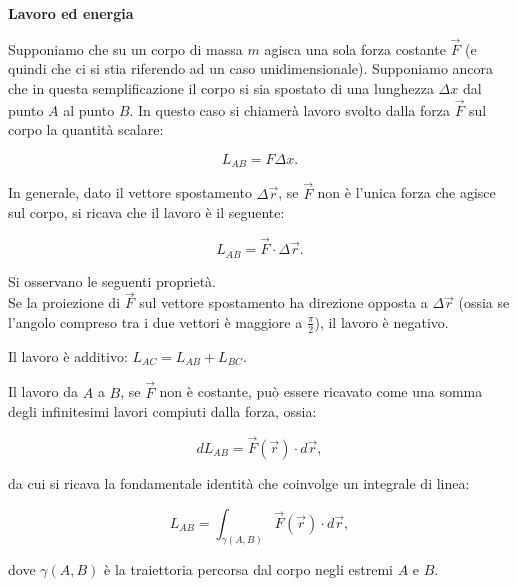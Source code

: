 \documentclass[11pt]{article}
\begin{document}
	\begin{center}
		\Large \textbf{Lavoro ed energia}
	\end{center}
	
	Supponiamo che su un corpo di massa $m$ agisca una sola forza
	costante $\vec{F}$ (e quindi che ci si stia riferendo
	ad un caso unidimensionale). Supponiamo ancora che
	in questa semplificazione il corpo si sia spostato
	di una lunghezza $\Delta x$ dal punto $A$ al 
	punto $B$. In questo caso si chiamerà
	lavoro svolto dalla forza $\vec{F}$ sul corpo la quantità
	scalare:
	
	\[ L_{AB} = F \Delta x. \]
	
	In generale, dato il vettore spostamento
	$\Delta \Vec{r}$, se $\Vec{F}$ non è l'unica forza
	che agisce sul corpo, si ricava che il lavoro è il seguente:
	
	\[ L_{AB} = \vec{F} \cdot \Delta \Vec{r}. \]
	
	\begin{remark} Si osservano le seguenti proprietà. \\
		
		\li Se la proiezione di $\vec{F}$ sul vettore spostamento ha
		direzione opposta a $\Delta \vec{r}$ (ossia se l'angolo
		compreso tra i due vettori è maggiore a $\frac{\pi}{2}$),
		il lavoro è negativo.
		
		\li Il lavoro è additivo: $L_{AC} = L_{AB} + L_{BC}$.
		
		\li Il lavoro da $A$ a $B$, se $\Vec{F}$ non è costante,
		può essere ricavato come una somma degli infinitesimi lavori
		compiuti dalla forza, ossia:
		
		\[ dL_{AB} = \Vec{F}(\Vec{r}) \cdot d\Vec{r}, \]
		
		da cui si ricava la fondamentale identità che coinvolge
		un integrale di linea:
		
		\[ L_{AB} = \int_{\gamma(A, B)} \vec{F}(\Vec{r}) \cdot d \vec{r}, \]
		
		dove $\gamma(A, B)$ è la traiettoria percorsa dal corpo
		negli estremi $A$ e $B$.
	\end{remark}
	
	
\end{document}

